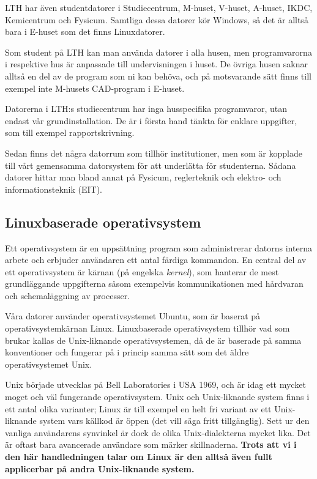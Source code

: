 \documentclass[a4paper,twocolumn]{book}
\begin{document}
LTH har även studentdatorer i Studiecentrum, M-huset, V-huset, A-huset, IKDC,
Kemicentrum och Fysicum.
Samtliga dessa datorer kör Windows, så det är alltså bara i E-huset som det
finns Linuxdatorer.

Som student på LTH kan man använda datorer i alla husen, men programvarorna i
respektive hus är anpassade till undervisningen i huset. De övriga husen
saknar alltså en del av de program som ni kan behöva, och på motsvarande sätt
finns till exempel inte M-husets CAD-program i E-huset.

Datorerna i LTH:s studiecentrum har inga husspecifika programvaror, utan
endast vår grundinstallation. De är i första hand tänkta för enklare
uppgifter, som till exempel rapportskrivning.

Sedan finns det några datorrum som tillhör institutioner, men som är kopplade
till vårt gemensamma datorsystem för att underlätta för studenterna. Sådana
datorer hittar man bland annat på Fysicum, reglerteknik och elektro- och
informationsteknik (EIT).

\subsection{Linuxbaserade operativsystem}

Ett operativsystem är en uppsättning program som administrerar datorns
interna arbete och erbjuder användaren ett antal färdiga kommandon. En central
del av ett operativsystem är kärnan (på engelska \emph{kernel}), som hanterar
de mest grundläggande uppgifterna såsom exempelvis kommunikationen med hårdvaran
och schemaläggning av processer.

Våra datorer använder operativsystemet Ubuntu, som är baserat på
operativsystemkärnan Linux. Linuxbaserade operativsystem tillhör vad som brukar
kallas de Unix-liknande operativsystemen, då de är baserade på samma konventioner
och fungerar på i princip samma sätt som det äldre operativsystemet Unix.

Unix började utvecklas på Bell Laboratories i USA 1969, och är idag ett
mycket moget och väl fungerande operativsystem. Unix och Unix-liknande system finns
i ett antal olika varianter; Linux är till exempel en helt fri variant av
ett Unix-liknande system vars källkod är öppen (det vill säga fritt tillgänglig).
Sett ur den vanliga användarens synvinkel är
dock de olika Unix-dialekterna mycket lika. Det är oftast bara avancerade
användare som märker skillnaderna. \textbf{Trots att vi i den här handledningen talar
om Linux är den alltså även fullt applicerbar på andra Unix-liknande system.}
\end{document}
